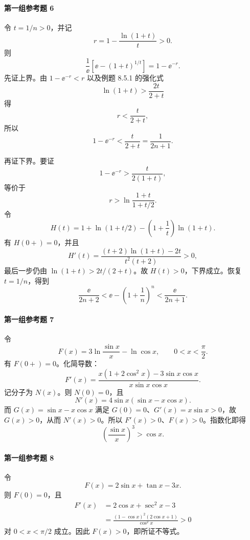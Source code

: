 \paragraph{第一组参考题 6}
\begin{xsolution}
令 $t=1/n>0$，并记
\[
  r=1-\frac{\ln(1+t)}t>0.
\]
则
\[
  \frac1\ee\left[\ee-(1+t)^{1/t}\right]=1-\ee^{-r}.
\]
先证上界。由 $1-\ee^{-r}<r$ 以及例题 8.5.1 的强化式
\[
  \ln(1+t)>\frac{2t}{2+t}
\]
得
\[
  r<\frac{t}{2+t},
\]
所以
\[
  1-\ee^{-r}<\frac{t}{2+t}=\frac1{2n+1}.
\]

再证下界。要证
\[
  1-\ee^{-r}>\frac{t}{2(1+t)},
\]
等价于
\[
  r>\ln\frac{1+t}{1+t/2}.
\]
令
\[
  H(t)=1+\ln(1+t/2)-\left(1+\frac1t\right)\ln(1+t).
\]
有 $H(0+)=0$，并且
\[
  H'(t)=\frac{(t+2)\ln(1+t)-2t}{t^2(t+2)}>0,
\]
最后一步仍由 $\ln(1+t)>2t/(2+t)$。故 $H(t)>0$，下界成立。恢复 $t=1/n$，得到
\[
  \boxed{
  \frac{\ee}{2n+2}<\ee-\left(1+\frac1n\right)^n
  <\frac{\ee}{2n+1}}.
\]
\end{xsolution}

\paragraph{第一组参考题 7}
\begin{xsolution}
令
\[
  F(x)=3\ln\frac{\sin x}{x}-\ln\cos x,
  \qquad0<x<\frac\pi2.
\]
有 $F(0+)=0$。化简导数：
\[
  F'(x)=
  \frac{x(1+2\cos^2x)-3\sin x\cos x}{x\sin x\cos x}.
\]
记分子为 $N(x)$。则 $N(0)=0$，且
\[
  N'(x)=4\sin x(\sin x-x\cos x).
\]
而 $G(x)=\sin x-x\cos x$ 满足 $G(0)=0$、$G'(x)=x\sin x>0$，故 $G(x)>0$，从而 $N'(x)>0$。所以 $F'(x)>0$、$F(x)>0$。指数化即得
\[
  \left(\frac{\sin x}{x}\right)^3>\cos x.
\]
\end{xsolution}

\paragraph{第一组参考题 8}
\begin{xsolution}
令
\[
  F(x)=2\sin x+\tan x-3x.
\]
则 $F(0)=0$，且
\begin{align*}
  F'(x)
  &=2\cos x+\operatorname{sec}^2x-3\\
  &=\frac{(1-\cos x)^2(2\cos x+1)}{\cos^2x}>0
\end{align*}
对 $0<x<\pi/2$ 成立。因此 $F(x)>0$，即所证不等式。
\end{xsolution}

